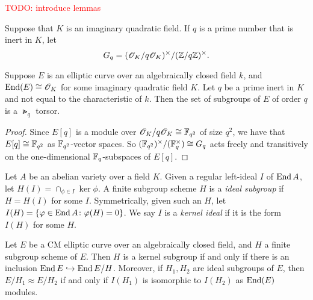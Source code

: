 \documentclass{amsart}
\begin{document}
\textcolor{red}{TODO: introduce lemmas}

\begin{definition}
  Suppose that $K$ is an imaginary quadratic field. If $q$ is a prime number that is inert in $K$, let
  $$G_q=(\mathscr{O}_K/q\mathscr{O}_K)^\times/(\mathbb{Z}/q\mathbb{Z})^\times. $$
\end{definition}

\begin{lemma}\label{lem:c-torsor}
  Suppose $E$ is an elliptic curve over an algebraically closed field $k$, and $\operatorname{End}(E) \cong \mathscr{O}_K$ for some imaginary quadratic field $K$. Let $q$ be a prime inert in $K$ and not equal to the characteristic of $k$. Then the set of subgroups of $E$ of order $q$ is a $\Gt_q$ torsor.
\end{lemma}
\begin{proof}
  Since $E[q]$ is a module over $\mathscr{O}_K/q\mathscr{O}_K \cong \mathbb{F}_{q^2}$  of size $q^2$, we have that $E[q] \cong \mathbb{F}_{q^2}$ as $\mathbb{F}_{q^2}$-vector spaces. So $(\mathbb{F}_{q^2})^\times/(\mathbb{F}_q^\times) \cong G_q$ acts freely and transitively on the one-dimensional $\mathbb{F}_q$-subspaces of $E[q]$.
\end{proof}

\begin{definition}\label{def:ker-idl}
  Let $A$ be an abelian variety over a field $K$. Given a regular left-ideal $I$ of $\operatorname{End} A$, let $H(I) = \cap_{\phi \in I}\ker \phi$. A finite subgroup scheme $H$ is a \emph{ideal subgroup} if $H = H(I)$ for some $I$. Symmetrically, given such an $H$, let $I(H) = \{\varphi \in \operatorname{End} A \colon \varphi(H) = 0\}$. We say $I$ is a \emph{kernel ideal} if it is the form $I(H)$ for some $H$.
\end{definition}

\begin{theorem}\label{thm:kani-20b}
  Let $E$ be a CM elliptic curve over an algebraically closed field, and $H$ a finite subgroup scheme of $E$. Then $H$ is a kernel subgroup if and only if there is an inclusion $\operatorname{End} E \hookrightarrow \operatorname{End} E/H$. Moreover, if $H_1,H_2$ are ideal subgroups of $E$, then $E/H_1 \approx E/H_2$ if and only if $I(H_1)$ is isomorphic to $I(H_2)$ as $\operatorname{End}(E)$ modules.
\end{theorem}
\end{document}
